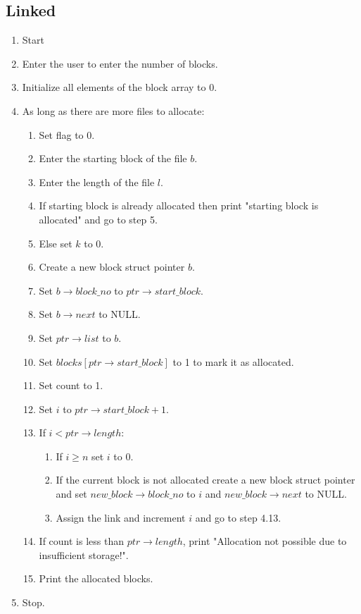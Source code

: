\subsection{Linked}
\begin{enumerate}[label=\arabic*.]
    \item Start
    \item Enter the user to enter the number of blocks.
    \item Initialize all elements of the block array to 0.
    \item As long as there are more files to allocate:
    \begin{enumerate}[label=4.\arabic*.]
        \item Set flag to 0.
        \item Enter the starting block of the file $b$.
        \item Enter the length of the file $l$.
        \item If starting block is already allocated then print "starting block is allocated" and go to step 5.
        \item Else set $k$ to 0.
        \item Create a new block struct pointer $b$.
        \item Set $b \rightarrow block\_no$ to $ptr \rightarrow start\_block$.
        \item Set $b \rightarrow next$ to NULL.
        \item Set $ptr \rightarrow list$ to $b$.
        \item Set $blocks[ptr \rightarrow start\_block]$ to 1 to mark it as allocated.
        \item Set count to 1.
        \item Set $i$ to $ptr \rightarrow start\_block + 1$.
        \item If $i < ptr \rightarrow length$:
        \begin{enumerate}[label=(a)]
            \item If $i \geq n$ set $i$ to 0.
            \item If the current block is not allocated create a new block struct pointer and set $new\_block \rightarrow block\_no$ to $i$ and $new\_block \rightarrow next$ to NULL.
            \item Assign the link and increment $i$ and go to step 4.13.
        \end{enumerate}
        \item If count is less than $ptr \rightarrow length$, print "Allocation not possible due to insufficient storage!".
        \item Print the allocated blocks.
    \end{enumerate}
    \item Stop.
\end{enumerate}

